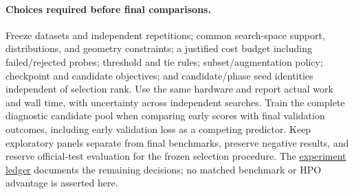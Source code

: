 \paragraph{Choices required before final comparisons.}
Freeze datasets and independent repetitions; common search-space support, distributions, and geometry constraints; a justified cost budget including failed/rejected probes; threshold and tie rules; subset/augmentation policy; checkpoint and candidate objectives; and candidate/phase seed identities independent of selection rank. Use the same hardware and report actual work and wall time, with uncertainty across independent searches. Train the complete diagnostic candidate pool when comparing early scores with final validation outcomes, including early validation loss as a competing predictor. Keep exploratory panels separate from final benchmarks, preserve negative results, and reserve official-test evaluation for the frozen selection procedure. The \href{run:../NOTES.md}{experiment ledger} documents the remaining decisions; no matched benchmark or HPO advantage is asserted here.
